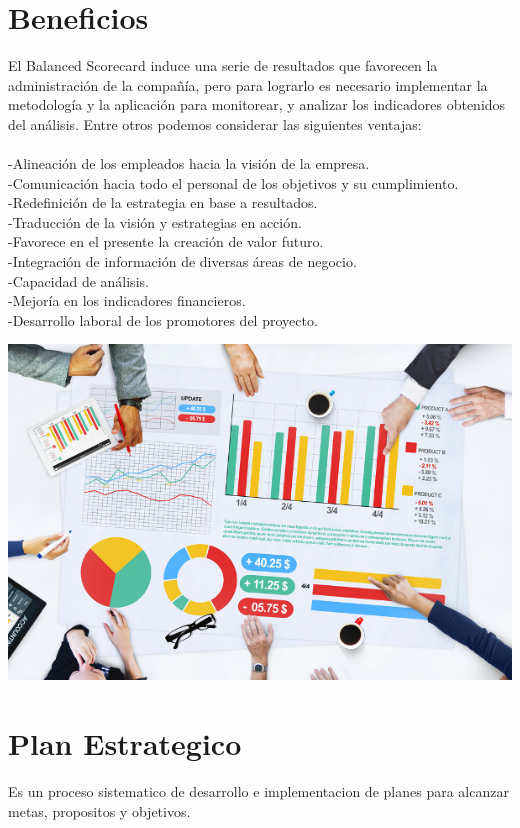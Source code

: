 \section{Beneficios}
\item{El Balanced Scorecard induce una serie de resultados que favorecen la administración de la compañía, pero para lograrlo es necesario implementar la metodología y la aplicación para monitorear, y analizar los indicadores obtenidos del análisis. Entre otros podemos considerar las siguientes ventajas:\\\\
-Alineación de los empleados hacia la visión de la empresa.\\
-Comunicación hacia todo el personal de los objetivos y su cumplimiento.\\
-Redefinición de la estrategia en base a resultados.\\
-Traducción de la visión y estrategias en acción.\\
-Favorece en el presente la creación de valor futuro.\\
-Integración de información de diversas áreas de negocio.\\
-Capacidad de análisis.\\
-Mejoría en los indicadores financieros.\\
-Desarrollo laboral de los promotores del proyecto.}

\begin{center}
\includegraphics[width=15cm]{./Imagenes/imagen3}
\end{center}

\section{Plan Estrategico}
\item{Es un proceso sistematico de desarrollo e implementacion de planes para alcanzar metas, propositos y objetivos.}

